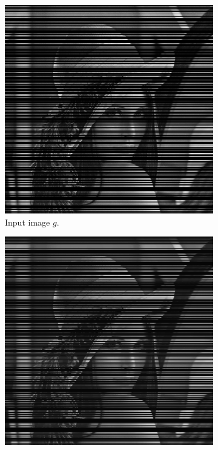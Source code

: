 \documentclass[abstracton]{scrreprt}
\begin{document}
            \begin{figure}[!ht]
                \centering
                \begin{subfigure}[b]{0.30\textwidth}
                    \includegraphics[width=\textwidth]{img/images/lena_inpaint.png}
                    \caption{Input image $g$.}
                \end{subfigure}
                \begin{subfigure}[b]{0.30\textwidth}
                    \includegraphics[width=\textwidth]{img/inpainting/001lena01.png}

\end{subfigure}
\end{figure}
\end{document}
